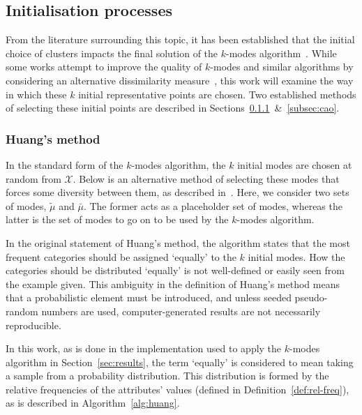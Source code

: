 \subsection{Initialisation processes}\label{subsec:inits}

From the literature surrounding this topic, it has been established that the 
initial choice of clusters impacts the final solution of the \(k\)-modes
algorithm~\cite{Cao2009, Huang1998}. While some works attempt to improve the
quality of \(k\)-modes and similar algorithms by considering an alternative 
dissimilarity measure~\cite{Ng2007}, this work will examine the way in which
these \(k\) initial representative points are chosen. Two established methods of 
selecting these initial points are described in
Sections~\ref{subsec:huang}~\&~\ref{subsec:cao}.


\subsubsection{Huang's method}\label{subsec:huang}

In the standard form of the \(k\)-modes algorithm, the \(k\) initial modes are 
chosen at random from \(\mathcal{X}\). Below is an alternative method of
selecting these modes that forces some diversity between them, as described 
in~\cite{Huang1998}. Here, we consider two sets of modes, \(\tilde{\mu}\) and
\(\bar{\mu}\). The former acts as a placeholder set of modes, whereas the latter
is the set of modes to go on to be used by the \(k\)-modes algorithm.



In the original statement of Huang's method, the algorithm states that the most
frequent categories should be assigned `equally' to the \(k\) initial modes. How
the categories should be distributed `equally' is not well-defined or easily
seen from the example given. This ambiguity in the definition of Huang's method
means that a probabilistic element must be introduced, and unless seeded
pseudo-random numbers are used, computer-generated results are not necessarily
reproducible.

In this work, as is done in the implementation used to apply the \(k\)-modes
algorithm in Section~\ref{sec:results}, the term `equally' is considered to mean
taking a sample from a probability distribution. This distribution is formed by
the relative frequencies of the attributes' values (defined in
Definition~\ref{def:rel-freq}), as is described in Algorithm~\ref{alg:huang}.

